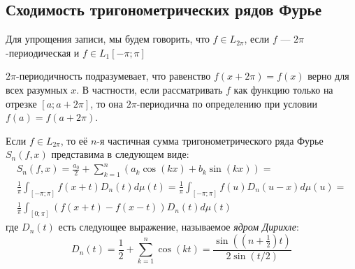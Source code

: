 \subsection{Сходимость тригонометрических рядов Фурье}

\begin{note}
	Для упрощения записи, мы будем говорить, что $f \in L_{2\pi}$, если $f$ --- $2\pi$-периодическая и $f \in L_1[-\pi; \pi]$
\end{note}

\begin{anote}
	$2\pi$-периодичность подразумевает, что равенство $f(x + 2\pi) = f(x)$ верно для всех разумных $x$. В частности, если рассматривать $f$ как функцию только на отрезке $[a; a + 2\pi]$, то она $2\pi$-периодична по определению при условии $f(a) = f(a + 2\pi)$.
\end{anote}

\begin{lemma}
	Если $f \in L_{2\pi}$, то её $n$-я частичная сумма тригонометрического ряда Фурье $S_n(f, x)$ представима в следующем виде:
	\begin{multline*}
		S_n(f, x) = \frac{a_0}{2} + \sum_{k = 1}^n (a_k\cos(kx) + b_k\sin(kx)) =
		\\
		\frac{1}{\pi}\int_{[-\pi; \pi]} f(x + t)D_n(t)d\mu(t) = \frac{1}{\pi}\int_{[-\pi; \pi]}f(u)D_n(u - x)d\mu(u) =
		\\
		\frac{1}{\pi} \int_{[0; \pi]} (f(x + t) - f(x - t))D_n(t)d\mu(t)
	\end{multline*}
	где $D_n(t)$ есть следующее выражение, называемое \textit{ядром Дирихле}:
	\[
		D_n(t) = \frac{1}{2} + \sum_{k = 1}^n \cos(kt) = \frac{\sin((n + \frac{1}{2})t)}{2\sin(t / 2)}
	\]
\end{lemma}

